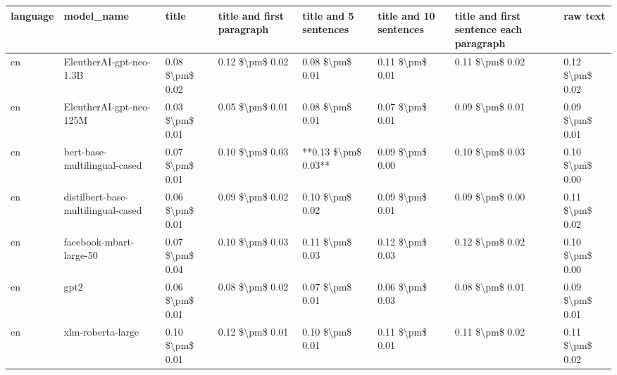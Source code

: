 \begin{tabular}{llllllll}
\toprule
language &                         model\_name &           title & title and first paragraph & title and 5 sentences & title and 10 sentences & title and first sentence each paragraph &            raw text \\
\midrule
      en &            EleutherAI-gpt-neo-1.3B & 0.08 \$\textbackslash pm\$ 0.02 &           0.12 \$\textbackslash pm\$ 0.02 &       0.08 \$\textbackslash pm\$ 0.01 &        0.11 \$\textbackslash pm\$ 0.01 &                         0.11 \$\textbackslash pm\$ 0.02 &     0.12 \$\textbackslash pm\$ 0.02 \\
      en &            EleutherAI-gpt-neo-125M & 0.03 \$\textbackslash pm\$ 0.01 &           0.05 \$\textbackslash pm\$ 0.01 &       0.08 \$\textbackslash pm\$ 0.01 &        0.07 \$\textbackslash pm\$ 0.01 &                         0.09 \$\textbackslash pm\$ 0.01 &     0.09 \$\textbackslash pm\$ 0.01 \\
      en &       bert-base-multilingual-cased & 0.07 \$\textbackslash pm\$ 0.01 &           0.10 \$\textbackslash pm\$ 0.03 &   **0.13 \$\textbackslash pm\$ 0.03** &        0.09 \$\textbackslash pm\$ 0.00 &                         0.10 \$\textbackslash pm\$ 0.03 &     0.10 \$\textbackslash pm\$ 0.00 \\
      en & distilbert-base-multilingual-cased & 0.06 \$\textbackslash pm\$ 0.01 &           0.09 \$\textbackslash pm\$ 0.02 &       0.10 \$\textbackslash pm\$ 0.02 &        0.09 \$\textbackslash pm\$ 0.01 &                         0.09 \$\textbackslash pm\$ 0.00 &     0.11 \$\textbackslash pm\$ 0.02 \\
      en &            facebook-mbart-large-50 & 0.07 \$\textbackslash pm\$ 0.04 &           0.10 \$\textbackslash pm\$ 0.03 &       0.11 \$\textbackslash pm\$ 0.03 &        0.12 \$\textbackslash pm\$ 0.03 &                         0.12 \$\textbackslash pm\$ 0.02 &     0.10 \$\textbackslash pm\$ 0.00 \\
      en &                               gpt2 & 0.06 \$\textbackslash pm\$ 0.01 &           0.08 \$\textbackslash pm\$ 0.02 &       0.07 \$\textbackslash pm\$ 0.01 &        0.06 \$\textbackslash pm\$ 0.03 &                         0.08 \$\textbackslash pm\$ 0.01 &     0.09 \$\textbackslash pm\$ 0.01 \\
      en &                  xlm-roberta-large & 0.10 \$\textbackslash pm\$ 0.01 &           0.12 \$\textbackslash pm\$ 0.01 &       0.10 \$\textbackslash pm\$ 0.01 &        0.11 \$\textbackslash pm\$ 0.01 &                         0.11 \$\textbackslash pm\$ 0.02 &     0.11 \$\textbackslash pm\$ 0.02 \\

\end{tabular}
